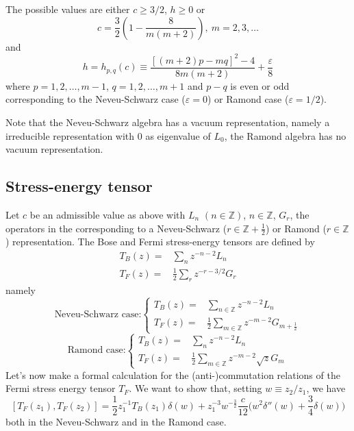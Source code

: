 \documentclass[11pt]{article}
\def\de{\delta}
\def\e{\varepsilon}
\begin{document}
The possible values are either $c\geq 3/2$, $h\geq 0$ or
\begin{equation}\label{c-values}
c = \frac32 \left( 1 - \frac{8}{m(m+2)}\right), \ m=2,3,\ldots
\end{equation}
and
\[
h= h_{p,q}(c)\equiv\frac{[(m+2)p - mq]^2 - 4}{8m(m+2)} + \frac{\e}{8}
\]
where $p= 1,2,\ldots,m-1$, $q=1,2,\ldots, m+1$ and $p-q$ is even or 
odd corresponding to the Neveu-Schwarz case ($\e= 0$) or Ramond 
case ($\e = 1/2$).

Note that the Neveu-Schwarz algebra has a vacuum representation, 
namely a irreducible representation with $0$ as eigenvalue of $L_0$, the Ramond 
algebra has no vacuum representation. 
%
\subsection{Stress-energy tensor}
\label{set}
Let $c$ be an admissible value as above with $L_n$ $(n\in\mathbb Z)$, 
$n\in\mathbb Z$, $G_r$, the operators in 
the corresponding to a Neveu-Schwarz ($r\in\mathbb Z + \frac12$) or Ramond ($r\in\mathbb Z$)
representation. The Bose and Fermi stress-energy 
tensors are defined by
\begin{align}
T_B(z) =& \sum_{n} z^{-n-2} L_n\\
T_F(z) =& \frac12 \sum_r z^{-r-3/2} G_r
\end{align}
namely
\begin{equation}
  \text{Neveu-Schwarz case:}\begin{cases}
T_{B}(z) =& \sum_{n\in\mathbb Z} z^{-n-2} L_n\\
T_{F}(z) =& \frac12 \sum_{m\in\mathbb Z} z^{-m-2} G_{m+\frac12}
\end{cases}
\end{equation}
%
\begin{equation}  \text{Ramond case:}\begin{cases}
T_{B}(z) =& \sum_{n} z^{-n-2} L_n\\
T_{F}(z) =& \frac12 \sum_{m\in\mathbb Z} z^{-m-2} \sqrt{z} G_m
\end{cases}
\end{equation}
%
Let's now make a formal calculation for the (anti-)commutation relations of the Fermi stress energy tensor $T_F$. We want to show that, setting $w\equiv z_2 /z_1$, we have
\begin{equation}\label{comrel}
[T_F(z_1), T_F(z_2)]= \frac12 z_1^{-1}T_B(z_1) \de(w)
+ z_1^{-3}w^{-\frac32}\frac{c}{12}
\big(w^2\de''(w)  + \frac34\de(w)\big)
\end{equation}
both in the Neveu-Schwarz and in the Ramond case.
\end{document}
